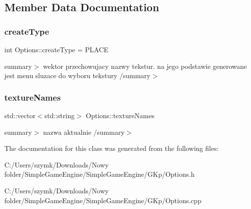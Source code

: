 \subsection{Member Data Documentation}
\mbox{\label{class_options_abf0c0bd98f610208b37d5ccc29986c12}} 
\subsubsection{\texorpdfstring{create\+Type}{createType}}
{\footnotesize\ttfamily int Options\+::create\+Type = P\+L\+A\+CE}

summary$>$ wektor przechowujacy nazwy tekstur. na jego podstawie generowane jest menu sluzace do wyboru tekstury /summary$>$ \mbox{\label{class_options_a1302853b860cb9384f79253c8ff13965}} 
\subsubsection{\texorpdfstring{texture\+Names}{textureNames}}
{\footnotesize\ttfamily std\+::vector$<$std\+::string$>$ Options\+::texture\+Names}

summary$>$ nazwa aktualnie /summary$>$ 

The documentation for this class was generated from the following files\+:\begin{DoxyCompactItemize}
\item 
C\+:/\+Users/szymk/\+Downloads/\+Nowy folder/\+Simple\+Game\+Engine/\+Simple\+Game\+Engine/\+G\+Kp/Options.\+h\item 
C\+:/\+Users/szymk/\+Downloads/\+Nowy folder/\+Simple\+Game\+Engine/\+Simple\+Game\+Engine/\+G\+Kp/Options.\+cpp\end{DoxyCompactItemize}
